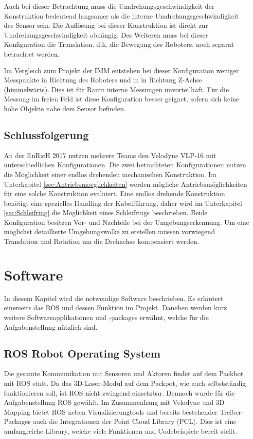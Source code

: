 Auch bei dieser Betrachtung  muss die Umdrehungsgeschwindigkeit der Konstruktion bedeutend langsamer als die interne Umdrehungsgeschwindigkeit des Sensor sein. Die Auflösung bei dieser Konstruktion ist direkt zur Umdrehungsgeschwindigkeit abhängig. 
Des Weiteren muss bei dieser Konfiguration die Translation, d.h. die Bewegung des Roboters, noch separat betrachtet werden.  

Im Vergleich zum Projekt der IMM entstehen bei dieser Konfiguration weniger Messpunkte in Richtung des Roboters und in in Richtung Z-Achse (himmelwärts). Dies ist für Raum interne Messungen unvorteilhaft. Für die Messung im freien Feld ist diese Konfiguration besser geignet, sofern sich keine  hohe Objekte nahe dem Sensor befinden.
 	
\subsection{Schlussfolgerung}
An der \ac{EnRicH} 2017 nutzen mehrere Teams den Velodyne VLP-16 mit unterschiedlichen Konfigurationen. Die zwei betrachteten Konfigurationen nutzen die Möglichkeit einer endlos drehenden mechanischen Konstruktion. Im Unterkapitel \ref{sec:Antriebsmoeglichkeiten} werden mögliche Antriebsmöglichkeiten für eine solche Konstruktion evaluiert. Eine endlos drehende Konstruktion benötigt eine spezielles Handling der Kabelführung, daher wird im Unterkapitel \ref{sec:Schleifring} die Möglichkeit eines Schleifrings beschrieben. Beide Konfiguration besitzen Vor- und Nachteile bei der Umgebungserkennung. Um eine möglichst detaillierte Umgebungswolke zu erstellen müssen vorwiegend Translation und Rotation um die Drehachse kompensiert werden.
  

\section{Software}
\label{sec:Software}
In diesem Kapitel wird die notwendige Software beschrieben. Es erläutert einerseits das \ac{ROS} und dessen Funktion im Projekt. Daneben werden kurz weitere Softwareapplikationen und -packages erwähnt, welche für die Aufgabenstellung nützlich sind.

\subsection{ROS Robot Operating System}
\label{subsec:ROS}
Die gesamte Kommunikation mit Sensoren und Aktoren findet auf dem Packbot mit \ac{ROS} statt. Da das 3D-Laser-Modul auf dem Packpot, wie auch selbstständig funktionieren soll, ist ROS nicht zwingend einsetzbar. Dennoch wurde für die Aufgabenstellung ROS gewählt. Im Zusammenhang mit Velodyne und 3D Mapping bietet ROS neben Visualisierungtools und  bereits bestehender Treiber-Packages auch die Integrationen der Point Cloud Library (PCL). Dies ist eine umfangreiche Library, welche viele Funktionen und Codebeispiele bereit stellt. 

